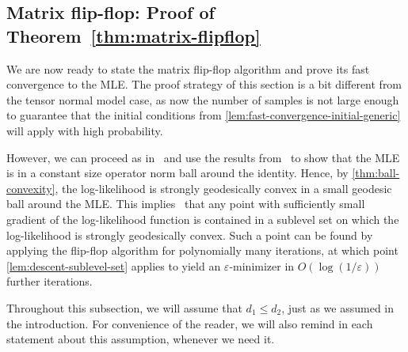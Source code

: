 \documentclass[aos]{imsart}
\theoremstyle{definition}
\numberwithin{equation}{section}
\newcommand{\eps}{\varepsilon}
\begin{document}
\subsection{Matrix flip-flop: Proof of Theorem~\ref{thm:matrix-flipflop}}

We are now ready to state the matrix flip-flop algorithm and prove its fast convergence to the MLE.
The proof strategy of this section is a bit different from the tensor normal model case, as now the number of samples is not large enough to guarantee that the initial conditions from \cref{lem:fast-convergence-initial-generic} will apply with high probability.

However, we can proceed as in~\cite{FM20} and use the results from~\cite{KLR19} to show that the MLE is in a constant size operator norm ball around the identity. Hence, by \cref{thm:ball-convexity}, the log-likelihood is strongly geodesically convex in a small geodesic ball around the MLE. This implies~\cite[Lemma 4.7]{FM20} that any point with sufficiently small gradient of the log-likelihood function is contained in a sublevel set on which the log-likelihood is strongly geodesically convex. Such a point can be found by applying the flip-flop algorithm for polynomially many iterations, at which point \cref{lem:descent-sublevel-set} applies to yield an $\eps$-minimizer in $O(\log(1/\eps))$ further iterations.

Throughout this subsection, we will assume that $d_1 \leq d_2$, just as we assumed in the introduction.
For convenience of the reader, we will also remind in each statement about this assumption, whenever we need it.
\end{document}
